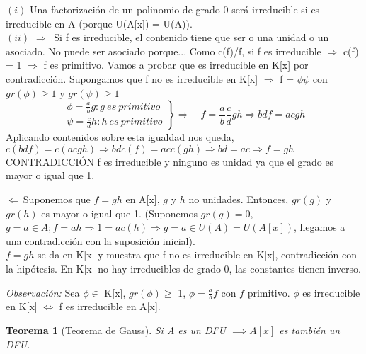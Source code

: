 \documentclass[11pt, a4paper, titlepage]{article}
\makeatletter
\renewenvironment{proof}[1][\proofname] {\vspace{-15pt}\par\pushQED{\qed}\normalfont\topsep6\p@\@plus6\p@\relax\trivlist\item[\hskip\labelsep\it#1\@addpunct{.}]\ignorespaces}{\popQED\endtrivlist\@endpefalse}
\theoremstyle{theorem-style}
\newtheorem*{nth}{Teorema}
\theoremstyle{definition-style}
\theoremstyle{remark-style}
\theoremstyle{example-style}
\makeatother
\begin{document}
\begin{proof}
$(i)$ Una factorización de un polinomio de grado 0 será irreducible si es irreducible en A (porque U(A[x]) = U(A)).\\
$(ii)$ $\displaystyle \boxed{\Rightarrow}\ $ Si f es irreducible, el contenido tiene que ser o una unidad o un asociado. No puede ser asociado porque...
Como c(f)/f, si f es irreducible $\Rightarrow$ c(f) = 1 $\Rightarrow$ f es primitivo. Vamos a probar que es irreducible en K[x] por contradicción. Supongamos que f no es irreducible en K[x] $\Rightarrow$ f = $\phi \psi$ con $gr(\phi) \geq 1$ y $gr(\psi) \geq 1$
$$
 \left .
      \begin{matrix} 
        \phi =  \frac{a}{b}g : g\ es\ primitivo\\
        \psi =  \frac{c}{d}h : h\ es\ primitivo
      \end{matrix} 
   \right \} 
   \Longrightarrow \quad f = \frac{a}{b} \frac{c}{d} gh \Rightarrow bdf = acgh
  $$
  Aplicando contenidos sobre esta igualdad nos queda, $c(bdf) = c(acgh) \Rightarrow bdc(f) = acc(gh) \Rightarrow bd = ac \Rightarrow f = gh $ CONTRADICCIÓN f es irreducible y ninguno es unidad ya que el grado es mayor o igual que 1.
  
$\displaystyle \boxed{\Leftarrow}\ $Suponemos que $f=gh$ en A[x], $g$ y $h$ no unidades. Entonces, $gr(g)$ y $gr(h)$ es mayor o igual que 1. (Suponemos $gr(g)=0$, $g = a \in A; f=ah \Rightarrow 1 = ac(h) \Rightarrow g=a \in U(A)=U(A[x])$, llegamos a una contradicción con la suposición inicial).  \\
$f=gh$ se da en K[x] y muestra que f no es irreducible en K[x], contradicción con la hipótesis.
En K[x] no hay irreducibles de grado 0, las constantes tienen inverso.
\end{proof}

\textit{Observación:} Sea $\phi \in$ K[x], $gr(\phi) \geq$ 1, $\phi=\frac{a}{b}f$ con $f$ primitivo. $\phi$ es irreducible en K[x] $\Leftrightarrow$ f es irreducible en A[x].

\begin{nth}[Teorema de Gauss]
	Si A es un DFU $\implies A[x]$ es también un DFU.
\end{nth}
\end{document}
